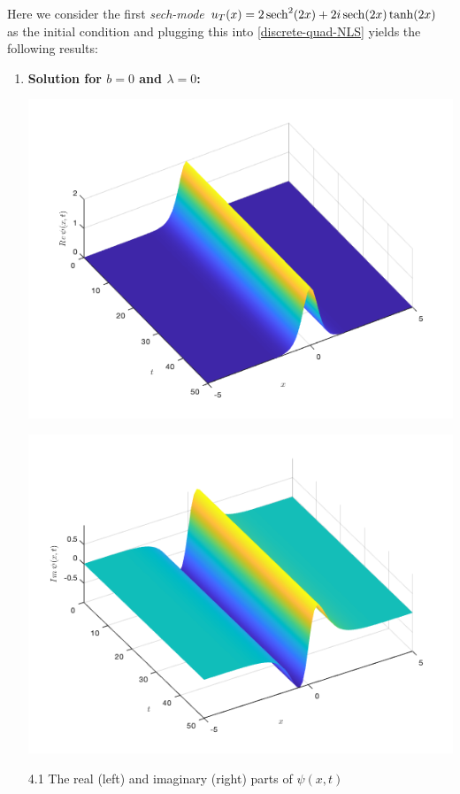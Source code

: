 \documentclass[12pt, letterpaper, twoside]{article}
\begin{document}
\begin{enumerate}[label=(\alph*)]
    Here we consider the first \textit{sech-mode}  $u_T(x) = 2 \sech^2 (2x) + 2i \sech (2x) \tanh(2x)$ as the initial condition and plugging this into \eqref{discrete-quad-NLS} yields the following results:
    \newpage
    \begin{enumerate}[label=(\roman*)]
    \item \textbf{Solution for $b=0$ and $\lambda=0$:}
    \begin{multicols}{2}
        \begin{center}
            \includegraphics[scale=0.35]{twisted modes/lambda0real.png}
        \end{center}
        \begin{center}
            \includegraphics[scale=0.35]{twisted modes/lamda0imag.png}
        \end{center}
    \end{multicols}
    \figurename{ 4.1 The real (left) and imaginary (right) parts of $\psi(x, t)$}
    \newline
    

\end{enumerate}
\end{enumerate}
\end{document}
